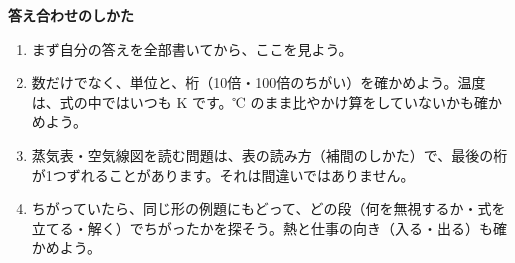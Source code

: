 \makeatletter
\def\phbkhead#1{\par\addvspace{4mm}\Needspace{6\baselineskip}\noindent{\sffamily\bfseries\large\color{bkDeep}#1}\par\nobreak\vspace{2mm}}
\newcommand\ph@tblstyle{row{1}={bg=bkVol!14, font=\sffamily\bfseries\footnotesize}, hlines={0.4pt,bkLine}, rowsep=1.4pt, colsep=3.5pt}
\newcommand\phyk{〔要確認〕}
\bkAnswerPages
\par\vspace{6mm}
\begin{tcolorbox}[bk base, colframe=bkTheme!60, colback=bkTheme!5, boxrule=0.8pt, arc=2mm, left=4mm, right=4mm, top=2.5mm, bottom=3mm]
{\sffamily\bfseries\color{bkDeep}答え合わせのしかた}\par\vspace{1.5mm}
\begin{enumerate}[label={\bkcircled{\arabic*}}, leftmargin=2.4\zw, itemsep=1pt, topsep=0pt]
\item まず自分の答えを全部書いてから、ここを見よう。
\item 数だけでなく、単位と、桁（10倍・100倍のちがい）を確かめよう。温度は、式の中ではいつも K です。℃ のまま比やかけ算をしていないかも確かめよう。
\item 蒸気表・空気線図を読む問題は、表の読み方（補間のしかた）で、最後の桁が1つずれることがあります。それは間違いではありません。
\item ちがっていたら、同じ形の例題にもどって、どの段（何を無視するか・式を立てる・解く）でちがったかを探そう。熱と仕事の向き（入る・出る）も確かめよう。
\end{enumerate}
\end{tcolorbox}

